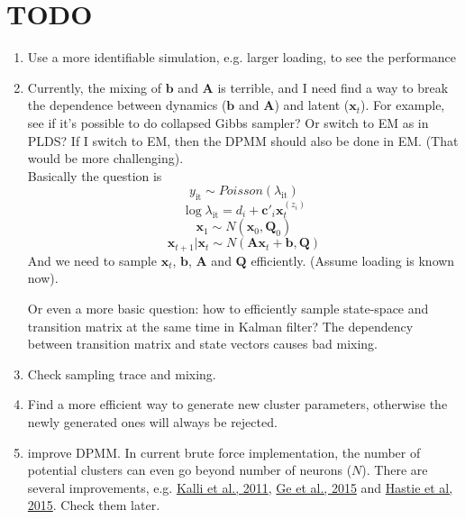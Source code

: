 \documentclass[]{article}
\begin{document}
\section{TODO}
\begin{enumerate}
	\def\labelenumi{(\arabic{enumi})}
	\item
	Use a more identifiable simulation, e.g. larger loading, to see the performance
	\item
	Currently, the mixing of \(\mathbf{b}\) and \(\mathbf{A}\) is terrible, and I need find a way to break the dependence between dynamics (\(\mathbf{b}\) and \(\mathbf{A}\)) and latent (\(\mathbf{x}_t\)). For example, see if it's possible to do collapsed Gibbs sampler? Or switch to EM as in PLDS? If I switch to EM, then the DPMM should also be done in EM. (That would be more challenging). \\
	
	Basically the question is
	\[y_{\text{it}} \sim Poisson(\lambda_{\text{it}})\]
	\[\log\lambda_{\text{it}} = d_{i} + \mathbf{c'}_{i}\mathbf{x}_{t}^{(z_{i})}\]
	\[\mathbf{x}_{1} \sim N(\mathbf{x}_{0},\mathbf{Q}_{0})\]
	\[\mathbf{x}_{t + 1}|\mathbf{x}_{t} \sim N(\mathbf{A}\mathbf{x}_{t} + \mathbf{b},\mathbf{Q})\]
	And we need to sample \(\mathbf{x}_t\), \(\mathbf{b}\), \(\mathbf{A}\) and \(\mathbf{Q}\) efficiently. (Assume loading is known now).
	
	Or even a more basic question: how to efficiently sample state-space and transition matrix at the same time in Kalman filter? The dependency between transition matrix and state vectors causes bad mixing.
	
	\item
	Check sampling trace and mixing.
	\item
	Find a more efficient way to generate new cluster parameters, otherwise the newly generated ones will always be rejected.
	\item
	improve DPMM. In current brute force implementation, the number of potential clusters can even go beyond number of neurons (\(N\)). There are several improvements, e.g. \href{https://link.springer.com/article/10.1007/s11222-009-9150-y}{Kalli et al., 2011}, \href{http://proceedings.mlr.press/v37/gea15.html}{Ge et al., 2015} and \href{https://link.springer.com/article/10.1007/s11222-014-9471-3}{Hastie et al, 2015}. Check them later.
\end{enumerate}
\end{document}
